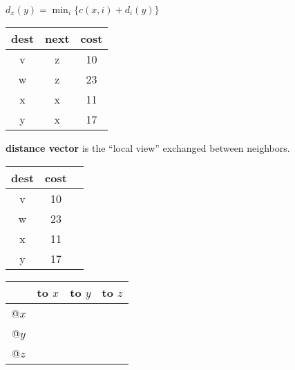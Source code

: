 \begin{cf}{\normalsize
	$d_x(y) = \min_i \{c(x,i) + d_i(y) \}$\\[1cm]

	\begin{tabular}{|c|c|c|}
	\hline
	dest & next & cost \\
	\hline
  v  & z & 10 \\
  w  & z & 23 \\
  x  & x & 11 \\
  y  & x & 17 \\
	\hline
	\end{tabular}
}
\end{cf}

\begin{cf}{\normalsize
	\textbf{distance vector} is the ``local view'' exchanged
	between neighbors.\\[1cm]

	\begin{tabular}{|c|c|c|}
	\hline
	dest & cost \\
	\hline
  v  & 10 \\
  w  & 23 \\
  x  & 11 \\
  y  & 17 \\
	\hline
	\end{tabular}
}
\end{cf}

\begin{cf}{\normalsize

	\vspace*{1cm}
	\begin{tabular}{|c|c|c|c|}
	\hline
	 & to $x$ & to $y$ & to $z$ \\
	\hline
  @$x$ & & & \\
  @$y$ & & & \\
  @$z$ & & & \\
	\hline
	\end{tabular}
}
\end{cf}

